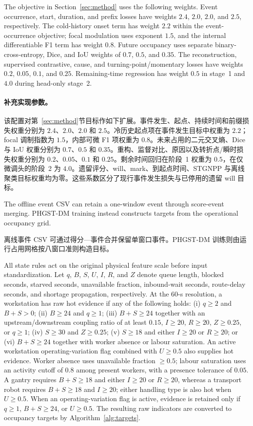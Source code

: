 \documentclass[a4paper,fleqn]{cas-dc}
\newcommand{\zhpara}[1]{%
  \par\begingroup\small\color{black!72}\noindent #1\par\endgroup}
\begin{document}
The objective in Section~\ref{sec:method} uses the following weights. Event occurrence, start, duration, and prefix losses have weights $2.4$, $2.0$, $2.0$, and $2.5$, respectively. The cold-history onset term has weight $2.2$ within the event-occurrence objective; focal modulation uses exponent $1.5$, and the internal differentiable F1 term has weight $0.8$. Future occupancy uses separate binary-cross-entropy, Dice, and IoU weights of $0.7$, $0.5$, and $0.35$. The reconstruction, supervised contrastive, cause, and turning-point/momentary losses have weights $0.2$, $0.05$, $0.1$, and $0.25$. Remaining-time regression has weight $0.5$ in stage~1 and $4.0$ during head-only stage~2.

\zhpara{\paragraph{补充实现参数。}
\label{app:implementation-parameters}
该配置对第~\ref{sec:method}节目标作如下扩展。事件发生、起点、持续时间和前缀损失权重分别为 $2.4$、$2.0$、$2.0$ 和 $2.5$。冷历史起点项在事件发生目标中权重为 $2.2$；focal 调制指数为 $1.5$，内部可微 F1 项权重为 $0.8$。未来占用的二元交叉熵、Dice 与 IoU 权重分别为 $0.7$、$0.5$ 和 $0.35$。重构、监督对比、原因以及转折点/瞬时损失权重分别为 $0.2$、$0.05$、$0.1$ 和 $0.25$。剩余时间回归在阶段~1 权重为 $0.5$，在仅微调头的阶段~2 为 $4.0$。遗留评分、will、mark、到起点时间、STGNPP 与离线聚类目标权重均为零。这些系数区分了现行事件发生损失与已停用的遗留 will 目标。}


The offline event CSV can retain a one-window event through score-event merging. PHGST-DM training instead constructs targets from the operational occupancy grid.

\zhpara{离线事件 CSV 可通过得分—事件合并保留单窗口事件。PHGST-DM 训练则由运行占用网格按八窗口准则构造目标。}


All state rules act on the original physical feature scale before input standardization. Let $q$, $B$, $S$, $U$, $I$, $R$, and $Z$ denote queue length, blocked seconds, starved seconds, unavailable fraction, inbound-wait seconds, route-delay seconds, and shortage propagation, respectively. At the 60-s resolution, a workstation has raw hot evidence if any of the following holds: (i) $q\geq2$ and $B+S>0$; (ii) $B\geq24$ and $q\geq1$; (iii) $B+S\geq24$ together with an upstream/downstream coupling ratio of at least $0.15$, $I\geq20$, $R\geq20$, $Z\geq0.25$, or $q\geq1$; (iv) $S\geq30$ and $Z\geq0.25$; (v) $S\geq18$ and either $I\geq20$ or $R\geq20$; or (vi) $B+S\geq24$ together with worker absence or labour saturation. An active workstation operating-variation flag combined with $U\geq0.5$ also supplies hot evidence. Worker absence uses unavailable fraction $\geq0.5$; labour saturation uses an activity cutoff of $0.8$ among present workers, with a presence tolerance of $0.05$. A gantry requires $B+S\geq18$ and either $I\geq20$ or $R\geq20$, whereas a transport robot requires $B+S\geq18$ and $I\geq20$; either handling type is also hot when $U\geq0.5$. When an operating-variation flag is active, evidence is retained only if $q\geq1$, $B+S\geq24$, or $U\geq0.5$. The resulting raw indicators are converted to occupancy targets by Algorithm~\ref{alg:targets}.
\end{document}
